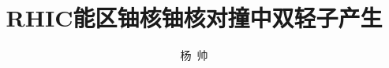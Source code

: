 \documentclass[doctor,twoside,openright,notchinese]{ustcthesis}
\title{RHIC能区铀核铀核对撞中双轻子产生}%
\author{杨\ 帅}
\begin{document}
  \maketitle

\frontmatter
\makeatletter
\ifustc@bachelor
	
	
	\tableofcontents

	\ustclot
	\ustclof
	\ustcloa
	
\else
	\tableofcontents

	\ustclot
	\ustclof
	
\fi
\makeatother

\mainmatter

  
  
  
  
  
  
  

\backmatter

   

  \begin{appendix}
    
  \end{appendix}

  \makeatletter
  \ifustc@bachelor\relax\else
    
  \fi
  \makeatother
\end{document}
